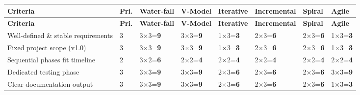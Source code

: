 \documentclass[12pt, a4paper]{article}
\begin{document}
\vspace{8pt}
\renewcommand{\arraystretch}{1.6}
\setlength{\tabcolsep}{5pt}

\begin{longtable}{|L{4.0cm}|C{0.8cm}|C{1.5cm}|C{1.3cm}|C{1.5cm}|C{1.6cm}|C{1.2cm}|C{1.2cm}|}
  \hline
  \textbf{\color{white}\small Criteria} &
  \textbf{\color{white}\small Pri.} &
  \textbf{\color{white}\small Water-fall} &
  \textbf{\color{white}\small V-Model} &
  \textbf{\color{white}\small Iterative} &
  \textbf{\color{white}\small Incremental} &
  \textbf{\color{white}\small Spiral} &
  \textbf{\color{white}\small Agile} \\
  \hline
  \endfirsthead
  \hline
  \textbf{\color{white}\small Criteria} &
  \textbf{\color{white}\small Pri.} &
  \textbf{\color{white}\small Water-fall} &
  \textbf{\color{white}\small V-Model} &
  \textbf{\color{white}\small Iterative} &
  \textbf{\color{white}\small Incremental} &
  \textbf{\color{white}\small Spiral} &
  \textbf{\color{white}\small Agile} \\
  \hline
  \endhead

  \small Well-defined \& stable requirements &
  \small 3 & \small 3×3=\textbf{9} & \small 3×3=\textbf{9} & \small 1×3=\textbf{3} & \small 2×3=\textbf{6} & \small 2×3=\textbf{6} & \small 1×3=\textbf{3} \\
  \hline

  \small Fixed project scope (v1.0) &
  \small 3 & \small 3×3=\textbf{9} & \small 3×3=\textbf{9} & \small 1×3=\textbf{3} & \small 2×3=\textbf{6} & \small 2×3=\textbf{6} & \small 1×3=\textbf{3} \\
  \hline

  \small Sequential phases fit timeline &
  \small 2 & \small 3×2=\textbf{6} & \small 2×2=\textbf{4} & \small 2×2=\textbf{4} & \small 2×2=\textbf{4} & \small 2×2=\textbf{4} & \small 2×2=\textbf{4} \\
  \hline

  \small Dedicated testing phase &
  \small 3 & \small 3×3=\textbf{9} & \small 3×3=\textbf{9} & \small 2×3=\textbf{6} & \small 2×3=\textbf{6} & \small 2×3=\textbf{6} & \small 3×3=\textbf{9} \\
  \hline

  \small Clear documentation output &
  \small 3 & \small 3×3=\textbf{9} & \small 3×3=\textbf{9} & \small 2×3=\textbf{6} & \small 2×3=\textbf{6} & \small 2×3=\textbf{6} & \small 1×3=\textbf{3} \\
  \hline


\end{longtable}
\end{document}
